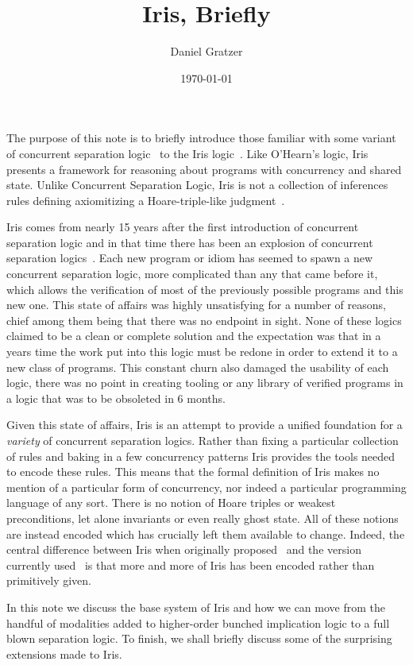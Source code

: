 \documentclass{amsart}
\title{Iris, Briefly}
\author{Daniel Gratzer}
\date{\today}
\begin{document}
\maketitle

The purpose of this note is to briefly introduce those familiar with
some variant of concurrent separation
logic~\citep{OHearn:02,OHearn:07} to the Iris
logic~\citep{Jung:15,Jung:16,Krebbers:17,Jung:17}. Like O'Hearn's
logic, Iris presents a framework for reasoning about programs with
concurrency and shared state. Unlike Concurrent Separation Logic, Iris
is not a collection of inferences rules defining axiomitizing a
Hoare-triple-like judgment~\citep{Hoare:69}.

Iris comes from nearly 15 years after the first introduction of
concurrent separation logic and in that time there has been an
explosion of concurrent separation logics~\citep{Parkinson:10}. Each
new program or idiom has seemed to spawn a new concurrent separation
logic, more complicated than any that came before it, which allows the
verification of most of the previously possible programs and this new
one. This state of affairs was highly unsatisfying for a number of
reasons, chief among them being that there was no endpoint in
sight. None of these logics claimed to be a clean or complete solution
and the expectation was that in a years time the work put into this
logic must be redone in order to extend it to a new class of
programs. This constant churn also damaged the usability of each
logic, there was no point in creating tooling or any library of
verified programs in a logic that was to be obsoleted in 6 months.

Given this state of affairs, Iris is an attempt to provide a unified
foundation for a \emph{variety} of concurrent separation
logics. Rather than fixing a particular collection of rules and baking
in a few concurrency patterns Iris provides the tools needed to encode
these rules. This means that the formal definition of Iris makes no
mention of a particular form of concurrency, nor indeed a particular
programming language of any sort. There is no notion of Hoare triples
or weakest preconditions, let alone invariants or even really ghost
state. All of these notions are instead encoded which has crucially
left them available to change. Indeed, the central difference between
Iris when originally proposed~\citep{Jung:15} and the version
currently used~\citep{Jung:17} is that more and more of Iris has been
encoded rather than primitively given.

In this note we discuss the base system of Iris and how we can move
from the handful of modalities added to higher-order bunched
implication logic to a full blown separation logic. To finish, we
shall briefly discuss some of the surprising extensions made to Iris.
\end{document}
